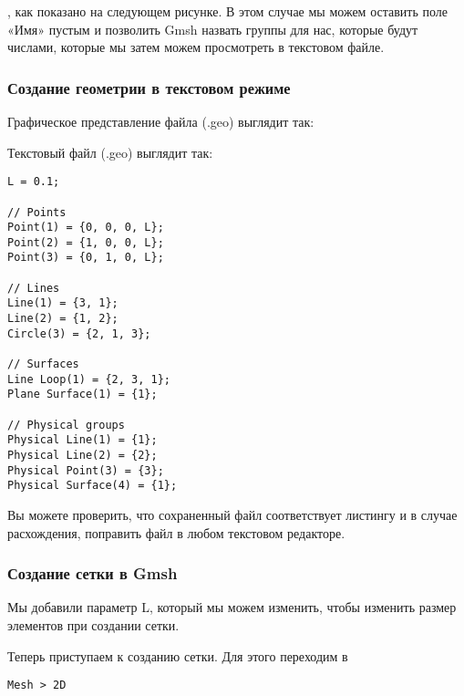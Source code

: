\documentclass[11pt]{article}
\begin{document}
, как показано на следующем рисунке. В этом случае мы можем оставить поле «Имя» пустым и позволить Gmsh назвать группы для нас, которые будут числами, которые мы затем можем просмотреть в текстовом файле.
        
\begin{center}
\end{center}
    
 \subsubsection{Создание геометрии в текстовом режиме}
   
   Графическое представление файла (.geo) выглядит так:
   \begin{center}
\end{center}
   
    Текстовый файл (.geo) выглядит так:
    \begin{Verbatim}[commandchars=\\\{\}]
L = 0.1;

// Points
Point(1) = {0, 0, 0, L};
Point(2) = {1, 0, 0, L};
Point(3) = {0, 1, 0, L};

// Lines
Line(1) = {3, 1};
Line(2) = {1, 2};
Circle(3) = {2, 1, 3};

// Surfaces
Line Loop(1) = {2, 3, 1};
Plane Surface(1) = {1};

// Physical groups
Physical Line(1) = {1};
Physical Line(2) = {2};
Physical Point(3) = {3};
Physical Surface(4) = {1};
\end{Verbatim}

Вы можете проверить, что сохраненный файл соответствует листингу и в случае расхождения, поправить файл в любом текстовом редакторе.

 \subsubsection{Создание сетки в Gmsh}
 
Мы добавили параметр L, который мы можем изменить, чтобы изменить размер элементов при создании сетки.

Теперь приступаем к созданию сетки. Для этого переходим в 
\begin{Verbatim}[commandchars=\\\{\}]
Mesh > 2D
\end{Verbatim}
\end{document}
